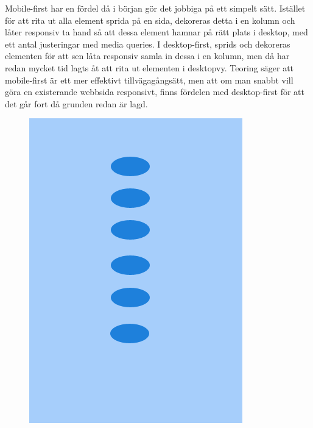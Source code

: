 \documentclass[11pt]{article}
\begin{document}
Mobile-first har en fördel då i början gör det jobbiga på ett simpelt sätt. Istället för att rita ut alla element sprida på en sida, dekoreras detta i en kolumn och låter responsiv ta hand så att dessa element hamnar på rätt plats i desktop, med ett antal justeringar med media queries. I desktop-first, sprids och dekoreras elementen för att sen låta responsiv samla in dessa i en kolumn, men då har redan mycket tid lagts åt att rita ut elementen i desktopvy. Teoring säger att mobile-first är ett mer effektivt tillvägagångsätt, men att om man snabbt vill göra en existerande webbsida responsivt, finns fördelen med desktop-first för att det går fort då grunden redan är lagd.
\\
\begin{figure}[H]
\centerline{%
\includegraphics[scale=0.3]{pics/mobiledots.png}\hspace{2em}%
}
\end{figure}
\end{document}
